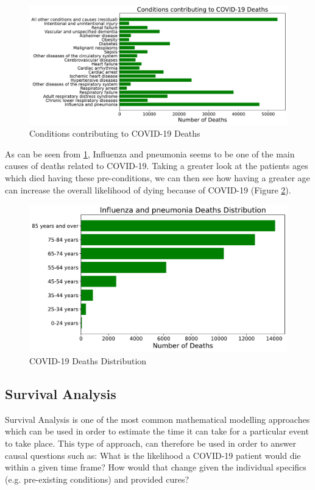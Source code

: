 \begin{figure}[ht!]%
    \centering
    \includegraphics[width=0.85\linewidth]{latex/images/deaths_conditions.pdf}
    \vspace{-0.2cm}
    \caption{Conditions contributing to COVID-19 Deaths}
    \label{d_cond}
\end{figure}

As can be seen from \ref{d_cond}, Influenza and pneumonia seems to be one of the main causes of deaths related to COVID-19. Taking a greater look at the patients ages which died having these pre-conditions, we can then see how having a greater age can increase the overall likelihood of dying because of COVID-19 (Figure \ref{d_top}).

\begin{figure}[ht!]%
    \centering
    \includegraphics[width=0.65\linewidth]{latex/images/deaths_top.pdf}
    \vspace{-0.2cm}
    \caption{COVID-19 Deaths Distribution}
    \label{d_top}
\end{figure}

\subsection{Survival Analysis}
\label{surv_app}
Survival Analysis is one of the most common mathematical modelling approaches which can be used in order to estimate the time it can take for a particular event to take place. This type of approach, can therefore be used in order to answer causal questions such as: What is the likelihood a COVID-19 patient would die within a given time frame? How would that change given the individual specifics (e.g. pre-existing conditions) and provided cures?


